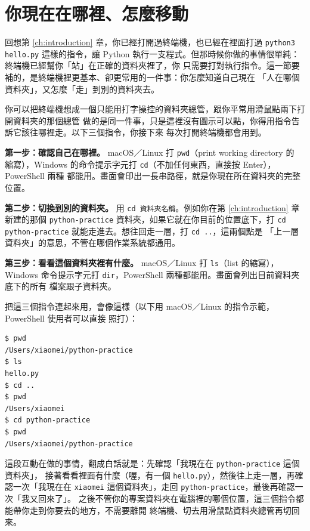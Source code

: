 \section{你現在在哪裡、怎麼移動}
\label{sec:terminal-location}

回想第 \ref{ch:introduction} 章，你已經打開過終端機，也已經在裡面打過 \texttt{python3 hello.py} 這樣的指令，讓
Python 執行一支程式。但那時候你做的事情很單純：終端機已經幫你「站」在正確的資料夾裡了，你
只需要打對執行指令。這一節要補的，是終端機裡更基本、卻更常用的一件事：你怎麼知道自己現在
「人在哪個資料夾」，又怎麼「走」到別的資料夾去。

你可以把終端機想成一個只能用打字操控的資料夾總管，跟你平常用滑鼠點兩下打開資料夾的那個總管
做的是同一件事，只是這裡沒有圖示可以點，你得用指令告訴它該往哪裡走。以下三個指令，你接下來
每次打開終端機都會用到。

\textbf{第一步：確認自己在哪裡。} macOS／Linux 打 \texttt{pwd}（print working directory 的
縮寫），Windows 的命令提示字元打 \texttt{cd}（不加任何東西，直接按 Enter），PowerShell 兩種
都能用。畫面會印出一長串路徑，就是你現在所在資料夾的完整位置。

\textbf{第二步：切換到別的資料夾。} 用 \texttt{cd 資料夾名稱}。例如你在第 \ref{ch:introduction} 章新建的那個
\texttt{python-practice} 資料夾，如果它就在你目前的位置底下，打
\texttt{cd python-practice} 就能走進去。想往回走一層，打 \texttt{cd ..}，這兩個點是
「上一層資料夾」的意思，不管在哪個作業系統都通用。

\textbf{第三步：看看這個資料夾裡有什麼。} macOS／Linux 打 \texttt{ls}（list 的縮寫），
Windows 命令提示字元打 \texttt{dir}，PowerShell 兩種都能用。畫面會列出目前資料夾底下的所有
檔案跟子資料夾。

把這三個指令連起來用，會像這樣（以下用 macOS／Linux 的指令示範，PowerShell 使用者可以直接
照打）：

\begin{verbatim}
$ pwd
/Users/xiaomei/python-practice
$ ls
hello.py
$ cd ..
$ pwd
/Users/xiaomei
$ cd python-practice
$ pwd
/Users/xiaomei/python-practice
\end{verbatim}

這段互動在做的事情，翻成白話就是：先確認「我現在在 \texttt{python-practice} 這個資料夾」，
接著看看裡面有什麼（喔，有一個 \texttt{hello.py}），然後往上走一層，再確認一次「我現在在
\texttt{xiaomei} 這個資料夾」，走回 \texttt{python-practice}，最後再確認一次「我又回來了」。
之後不管你的專案資料夾在電腦裡的哪個位置，這三個指令都能帶你走到你要去的地方，不需要離開
終端機、切去用滑鼠點資料夾總管再切回來。

